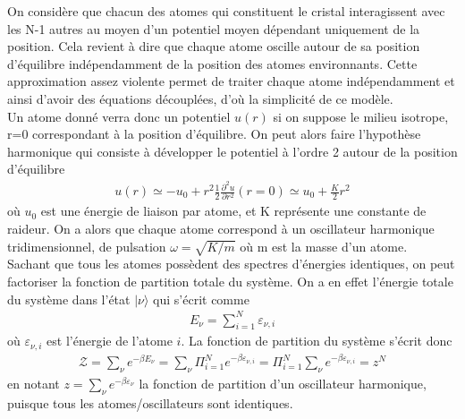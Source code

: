 \documentclass[12pt,prb,aps,epsf]{article}
\begin{document}
On considère que chacun des atomes qui constituent le cristal interagissent avec les N-1 autres au moyen d'un potentiel moyen dépendant uniquement de la position. Cela revient à dire que chaque atome oscille autour de sa position d'équilibre indépendamment de la position des atomes environnants. Cette approximation assez violente permet de traiter chaque atome indépendamment et ainsi d'avoir des équations découplées, d'où la simplicité de ce modèle.\\

Un atome donné verra donc un potentiel $u(r)$ si on suppose le milieu isotrope, r=0 correspondant à la position d'équilibre. On peut alors faire l'hypothèse harmonique qui consiste à développer le potentiel à l'ordre 2 autour de la position d'équilibre 
\begin{eqnarray}
u(r) \simeq -u_0 + r^2\frac{1}{2}\frac{\partial^2 u}{\partial r^2}(r=0) \simeq u_0 + \frac{K}{2} r^2
\end{eqnarray}
où $u_0$ est une énergie de liaison par atome, et K représente une constante de raideur. On a alors que chaque atome correspond à un oscillateur harmonique tridimensionnel, de pulsation $\omega =\sqrt{K/m}$ où m est la masse d'un atome.\\

Sachant que tous les atomes possèdent des spectres d'énergies identiques, on peut factoriser la fonction de partition totale du système. On a en effet l'énergie totale du système dans l'état $|\nu\rangle$ qui s'écrit comme 
\begin{eqnarray}
E_{\nu} = \sum_{i=1}^{N} \varepsilon_{\nu,i}
\end{eqnarray} 
où $\varepsilon_{\nu,i}$ est l'énergie de l'atome $i$. La fonction de partition du système s'écrit donc 
\begin{eqnarray}
\mathcal{Z} = \sum_{\nu} e^{-\beta E_{\nu}} = \sum_{\nu} \Pi_{i=1}^Ne^{-\beta \varepsilon_{\nu,i}} = \Pi_{i=1}^N \sum_{\nu}e^{-\beta \varepsilon_{\nu,i}} = z^N
\end{eqnarray}
en notant $z=\sum_{\nu}e^{-\beta \varepsilon_{\nu}}$ la fonction de partition d'un oscillateur harmonique, puisque tous les atomes/oscillateurs sont identiques.\\
\end{document}
